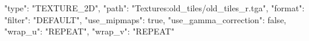 {
	"type": "TEXTURE_2D",
	"path": "Textures:old_tiles/old_tiles_r.tga",
	"format": {
		"filter": "DEFAULT",
		"use_mipmaps": true,
		"use_gamma_correction": false,
		"wrap_u": "REPEAT",
		"wrap_v": "REPEAT"
	}
}